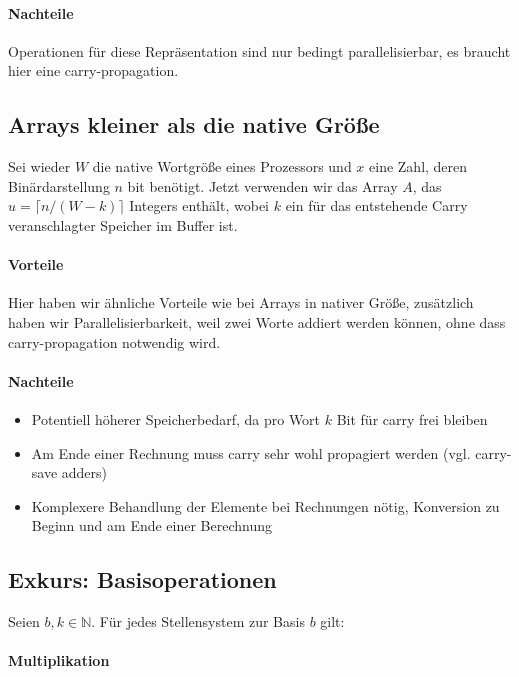 \paragraph{Nachteile}

Operationen für diese Repräsentation sind nur bedingt parallelisierbar, es braucht hier eine carry-propagation.

\subsection{Arrays kleiner als die native Größe}

Sei wieder $W$ die native Wortgröße eines Prozessors und $x$ eine Zahl, deren Binärdarstellung $n$ bit benötigt. Jetzt verwenden wir das Array $A$, das 
$u = \lceil n/(W-k) \rceil$ Integers enthält, wobei $k$ ein für das entstehende Carry veranschlagter Speicher im Buffer ist.

\paragraph{Vorteile}

Hier haben wir ähnliche Vorteile wie bei Arrays in nativer Größe, zusätzlich haben wir Parallelisierbarkeit, weil zwei Worte addiert werden können, ohne dass carry-propagation 
notwendig wird.

\paragraph{Nachteile}

\begin{itemize}
    \item Potentiell höherer Speicherbedarf, da pro Wort $k$ Bit für carry frei bleiben
    \item Am Ende einer Rechnung muss carry sehr wohl propagiert werden (vgl. carry-save adders)
    \item Komplexere Behandlung der Elemente bei Rechnungen nötig, Konversion zu Beginn und am Ende einer Berechnung
\end{itemize}

\subsection*{Exkurs: Basisoperationen}

Seien $b, k \in \mathbb{N}$. Für jedes Stellensystem zur Basis $b$ gilt:

\paragraph{Multiplikation}

